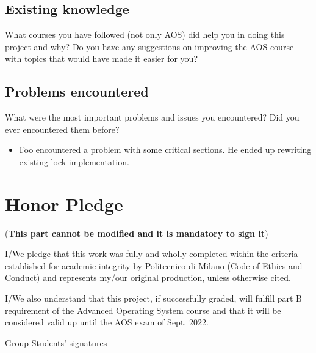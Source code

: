 \documentclass[10pt,a4]{article}
\begin{document}
\subsection{Existing knowledge}
What courses you have followed (not only AOS) did help you in doing this project
and why? Do you have any suggestions on improving the AOS course with topics
that would have made it easier for you?

\subsection{Problems encountered}
What were the most important problems and issues you encountered? Did you ever
encountered them before? 

\begin{itemize}
\item Foo encountered a problem with some critical sections. He ended up
  rewriting existing lock implementation.
\end{itemize}

\section{Honor Pledge}
(\textbf{This part cannot be modified and it is mandatory to sign it})

I/We pledge that this work was fully and wholly completed within the criteria
established for academic integrity by Politecnico di Milano (Code of Ethics and
Conduct) and represents my/our original production, unless otherwise cited.

I/We also understand that this project, if successfully graded,  will fulfill part B requirement of the
Advanced Operating System course and that it will be considered valid up until
the AOS exam of Sept. 2022. 

\begin{flushright}
Group Students' signatures
\end{flushright}
\end{document}
